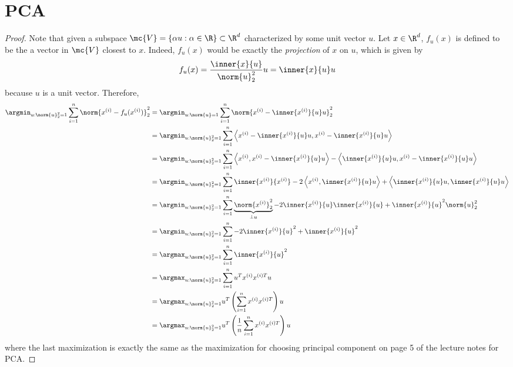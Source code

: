 \documentclass[11pt]{article}
\newcommand{\upi}[0]{^{(i)}}
\begin{document}
	\section{PCA}
	\begin{proof}
		Note that given a subspace $\mc{V} = \{\alpha u: \alpha \in \R\} \subset \R^d$ characterized by some unit vector $u$. Let $x \in \R^d$, $f_u(x)$ is defined to be the a vector in $\mc{V}$ closest to $x$. Indeed, $f_u(x)$ would be exactly the \emph{projection} of $x$ on $u$, which is given by
		\begin{align}
			f_u(x) = \frac{\inner{x}{u}}{\norm{u}^2_2} u = \inner{x}{u}u
		\end{align}
		because $u$ is a unit vector. Therefore,
		\begin{align}
			\argmin_{u: \norm{u}^2_2=1} \sum_{i=1}^n \norm{x\upi - f_u(x\upi)}^2_2 &= \argmin_{u: \norm{u}=1} \sum_{i=1}^n \norm{x\upi - \inner{x\upi}{u}u}^2_2 \\
			&= \argmin_{u: \norm{u}^2_2=1} \sum_{i=1}^n \left \langle
			x\upi - \inner{x\upi}{u}u,
			x\upi - \inner{x\upi}{u}u
			\right \rangle \\
			&= \argmin_{u: \norm{u}^2_2=1} \sum_{i=1}^n \left \langle x\upi, x\upi - \inner{x\upi}{u}u \right \rangle 
			- \left \langle \inner{x\upi}{u}u,
			x\upi - \inner{x\upi}{u}u \right \rangle \\
			&= \argmin_{u: \norm{u}^2_2=1} \sum_{i=1}^n \inner{x\upi}{x\upi}
			- 2 \left \langle
			x\upi, \inner{x\upi}{u}u
			\right \rangle
			+ \left \langle
			\inner{x\upi}{u}u,
			\inner{x\upi}{u}u
			\right \rangle \\
			&= \argmin_{u: \norm{u}^2_2=1} \sum_{i=1}^n \underbrace{\norm{x\upi}^2_2}_{\perp u}
			- 2 \inner{x\upi}{u} \inner{x\upi}{u}
			+ \inner{x\upi}{u}^2 \norm{u}^2_2 \\
			&= \argmin_{u: \norm{u}^2_2=1} \sum_{i=1}^n - 2  \inner{x\upi}{u}^2 +  \inner{x\upi}{u}^2 \\
			&= \argmax_{u: \norm{u}^2_2=1} \sum_{i=1}^n \inner{x\upi}{u}^2 \\
			&= \argmax_{u: \norm{u}^2_2=1} \sum_{i=1}^n u^T x\upi x^{(i)T} u \\
			&= \argmax_{u: \norm{u}^2_2=1} u^T \left(\sum_{i=1}^n x\upi x^{(i)T}\right) u \\
			&= \argmax_{u: \norm{u}^2_2=1} u^T \left(\frac{1}{n}\sum_{i=1}^n x\upi x^{(i)T}\right) u
		\end{align}
		where the last maximization is exactly the same as the maximization for choosing principal component on page 5 of the lecture notes for PCA.
	\end{proof}
	\newpage
\end{document}
